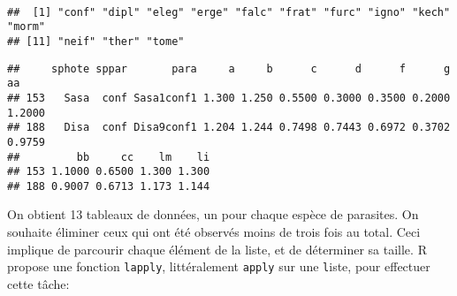 \begin{knitrout}
\color{fgcolor}\begin{kframe}
\begin{flushleft}
\ttfamily\noindent
{}\hlassignement{\usebox{\hlnormalsizeboxlessthan}-}{\ }\hlkeyword{(}\hlkeyword{,}{\ }\hlkeyword{\usebox{\hlnormalsizeboxdollar}}\hlkeyword{)}\hspace*{\fill}\\
\hlstd{}\hlkeyword{(}\hlkeyword{)}\mbox{}
\normalfont
\end{flushleft}
\begin{verbatim}
##  [1] "conf" "dipl" "eleg" "erge" "falc" "frat" "furc" "igno" "kech" "morm"
## [11] "neif" "ther" "tome"
\end{verbatim}
\begin{flushleft}
\ttfamily\noindent
{}\hlkeyword{\usebox{\hlnormalsizeboxdollar}}\mbox{}
\normalfont
\end{flushleft}
\begin{verbatim}
##     sphote sppar       para     a     b      c      d      f      g     aa
## 153   Sasa  conf Sasa1conf1 1.300 1.250 0.5500 0.3000 0.3500 0.2000 1.2000
## 188   Disa  conf Disa9conf1 1.204 1.244 0.7498 0.7443 0.6972 0.3702 0.9759
##         bb     cc    lm    li
## 153 1.1000 0.6500 1.300 1.300
## 188 0.9007 0.6713 1.173 1.144
\end{verbatim}
\end{kframe}
\end{knitrout}


\noindent On obtient 13 tableaux de données, un pour chaque espèce de parasites.
On souhaite éliminer ceux qui ont été observés moins de trois fois au total.
Ceci implique de parcourir chaque élément de la liste, et de déterminer sa taille.
R propose une fonction \texttt{lapply}, littéralement \texttt{apply} sur une \texttt{l}iste, pour effectuer cette tâche:

